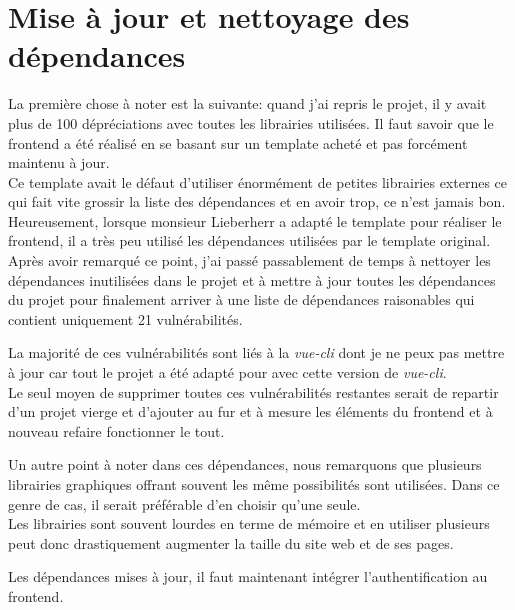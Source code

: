 \documentclass[
    iai, %
    il, %
]{heig-tb}
\begin{document}
\section{Mise à jour et nettoyage des dépendances}
La première chose à noter est la suivante: quand j'ai repris le projet, il y avait plus de 100 dépréciations avec toutes les librairies utilisées. Il faut savoir que le \Gls{frontend} a été réalisé en se basant sur un \Gls{template} acheté et pas forcément maintenu à jour. \\
Ce \Gls{template} avait le défaut d'utiliser énormément de petites librairies externes ce qui fait vite grossir la liste des dépendances et en avoir trop, ce n'est jamais bon. \\
Heureusement, lorsque monsieur Lieberherr a adapté le \Gls{template} pour réaliser le \Gls{frontend}, il a très peu utilisé les dépendances utilisées par le \Gls{template} original.\\
Après avoir remarqué ce point, j'ai passé passablement de temps à nettoyer les dépendances inutilisées dans le projet et à mettre à jour toutes les dépendances du projet pour finalement arriver à une liste de dépendances raisonables qui contient uniquement 21 vulnérabilités.

La majorité de ces vulnérabilités sont liés à la \emph{vue-cli} dont je ne peux pas mettre à jour car tout le projet a été adapté pour avec cette version de \emph{vue-cli}. \\
Le seul moyen de supprimer toutes ces vulnérabilités restantes serait de repartir d'un projet vierge et d'ajouter au fur et à mesure les éléments du \Gls{frontend} et à nouveau refaire fonctionner le tout.

Un autre point à noter dans ces dépendances, nous remarquons que plusieurs librairies graphiques offrant souvent les même possibilités sont utilisées. Dans ce genre de cas, il serait préférable d'en choisir qu'une seule. \\
Les librairies sont souvent lourdes en terme de mémoire et en utiliser plusieurs peut donc drastiquement augmenter la taille du site web et de ses pages.

Les dépendances mises à jour, il faut maintenant intégrer l'authentification au \Gls{frontend}.
\end{document}
